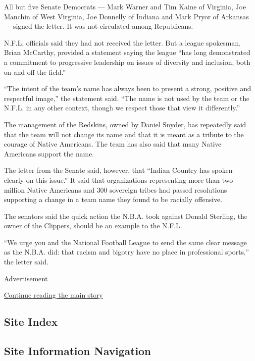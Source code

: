 All but five Senate Democrats --- Mark Warner and Tim Kaine of Virginia,
Joe Manchin of West Virginia, Joe Donnelly of Indiana and Mark Pryor of
Arkansas --- signed the letter. It was not circulated among Republicans.

N.F.L. officials said they had not received the letter. But a league
spokesman, Brian McCarthy, provided a statement saying the league ``has
long demonstrated a commitment to progressive leadership on issues of
diversity and inclusion, both on and off the field.''

``The intent of the team's name has always been to present a strong,
positive and respectful image,'' the statement said. ``The name is not
used by the team or the N.F.L. in any other context, though we respect
those that view it differently.''

The management of the Redskins, owned by Daniel Snyder, has repeatedly
said that the team will not change its name and that it is meant as a
tribute to the courage of Native Americans. The team has also said that
many Native Americans support the name.

The letter from the Senate said, however, that ``Indian Country has
spoken clearly on this issue.'' It said that organizations representing
more than two million Native Americans and 300 sovereign tribes had
passed resolutions supporting a change in a team name they found to be
racially offensive.

The senators said the quick action the N.B.A. took against Donald
Sterling, the owner of the Clippers, should be an example to the N.F.L.

``We urge you and the National Football League to send the same clear
message as the N.B.A. did: that racism and bigotry have no place in
professional sports,'' the letter said.

Advertisement

\protect\hyperlink{after-bottom}{Continue reading the main story}

\hypertarget{site-index}{%
\subsection{Site Index}\label{site-index}}

\hypertarget{site-information-navigation}{%
\subsection{Site Information
Navigation}\label{site-information-navigation}}

